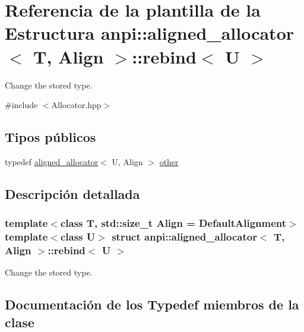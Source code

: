 \hypertarget{structanpi_1_1aligned__allocator_1_1rebind}{}\section{Referencia de la plantilla de la Estructura anpi\+:\+:aligned\+\_\+allocator$<$ T, Align $>$\+:\+:rebind$<$ U $>$}
\label{structanpi_1_1aligned__allocator_1_1rebind}


Change the stored type.  




{\ttfamily \#include $<$Allocator.\+hpp$>$}

\subsection*{Tipos públicos}
\begin{DoxyCompactItemize}
\item 
typedef \hyperlink{classanpi_1_1aligned__allocator}{aligned\+\_\+allocator}$<$ U, Align $>$ \hyperlink{structanpi_1_1aligned__allocator_1_1rebind_a8f85ff3293838d8d221e946d60064eb6}{other}
\end{DoxyCompactItemize}


\subsection{Descripción detallada}
\subsubsection*{template$<$class T, std\+::size\+\_\+t Align = Default\+Alignment$>$\newline
template$<$class U$>$\newline
struct anpi\+::aligned\+\_\+allocator$<$ T, Align $>$\+::rebind$<$ U $>$}

Change the stored type. 

\subsection{Documentación de los \textquotesingle{}Typedef\textquotesingle{} miembros de la clase}
\mbox{\label{structanpi_1_1aligned__allocator_1_1rebind_a8f85ff3293838d8d221e946d60064eb6}} 

